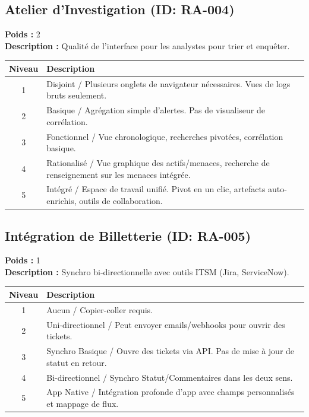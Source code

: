 \documentclass{article}
\begin{document}
\subsection{Atelier d'Investigation (ID: RA-004)}
\textbf{Poids :} 2 \\
\textbf{Description :} Qualité de l'interface pour les analystes pour trier et enquêter.
\vspace{0.3cm}
\begin{longtable}{|c|p{12cm}|}
\hline
\rowcolor{lightgray} \textbf{Niveau} & \textbf{Description} \\ \hline
1 & Disjoint / Plusieurs onglets de navigateur nécessaires. Vues de logs bruts seulement. \\ \hline
2 & Basique / Agrégation simple d'alertes. Pas de visualiseur de corrélation. \\ \hline
3 & Fonctionnel / Vue chronologique, recherches pivotées, corrélation basique. \\ \hline
4 & Rationalisé / Vue graphique des actifs/menaces, recherche de renseignement sur les menaces intégrée. \\ \hline
5 & Intégré / Espace de travail unifié. Pivot en un clic, artefacts auto-enrichis, outils de collaboration. \\ \hline
\end{longtable}
\vspace{0.5cm}
\subsection{Intégration de Billetterie (ID: RA-005)}
\textbf{Poids :} 1 \\
\textbf{Description :} Synchro bi-directionnelle avec outils ITSM (Jira, ServiceNow).
\vspace{0.3cm}
\begin{longtable}{|c|p{12cm}|}
\hline
\rowcolor{lightgray} \textbf{Niveau} & \textbf{Description} \\ \hline
1 & Aucun / Copier-coller requis. \\ \hline
2 & Uni-directionnel / Peut envoyer emails/webhooks pour ouvrir des tickets. \\ \hline
3 & Synchro Basique / Ouvre des tickets via API. Pas de mise à jour de statut en retour. \\ \hline
4 & Bi-directionnel / Synchro Statut/Commentaires dans les deux sens. \\ \hline
5 & App Native / Intégration profonde d'app avec champs personnalisés et mappage de flux. \\ \hline
\end{longtable}
\vspace{0.5cm}
\end{document}
